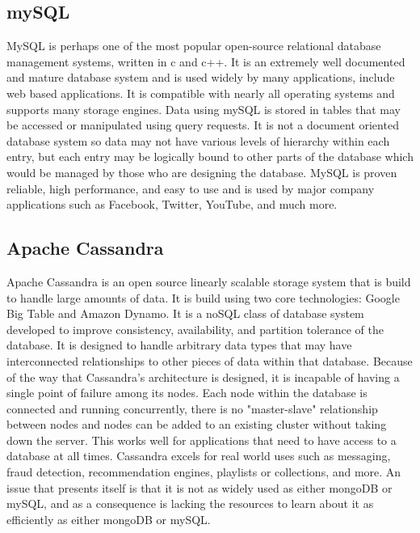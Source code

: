 \documentclass[onecolumn, draftclsnofoot,10pt, compsoc]{IEEEtran}
\begin{document}
	\subsection{mySQL}	
	
		MySQL is perhaps one of the most popular open-source relational database management systems, written in c and c++. It is an extremely well documented and mature database system and 
		is used widely by many applications, include web based applications. It is compatible with nearly all operating systems and supports many storage engines. Data 
		using mySQL is stored in tables that may be accessed or manipulated using query requests. It is not a document oriented database system so data may not have 
		various levels of hierarchy within each entry, but each entry may be logically bound to other parts of the database which would be managed by those who
		are designing the database. MySQL is proven reliable, high performance, and easy to use and is used by major company applications such as Facebook, Twitter, YouTube, and much more.

	\subsection{Apache Cassandra}
	
		Apache Cassandra is an open source linearly scalable storage system that is build to handle large amounts of data. It is build using two core technologies: Google Big Table
		and Amazon Dynamo. It is a noSQL class of database system developed to improve consistency, availability, and partition tolerance of the database. It is designed
		to handle arbitrary data types that may have interconnected relationships to other pieces of data within that database. Because of the way that Cassandra's architecture 
		is designed, it is incapable of having a single point of failure among its nodes. Each node within the database is connected and running concurrently, there is no 
		"master-slave" relationship between nodes and nodes can be added to an existing cluster without taking down the server. This works well for applications that need to 
		have access to a database at all times. Cassandra excels for real world uses such as messaging, fraud detection, recommendation engines, playlists or collections, and more.
		An issue that presents itself is that it is not as widely used as either mongoDB or mySQL, and as a consequence is lacking the resources to learn about it as efficiently
		as either mongoDB or mySQL.
		
\end{document}
